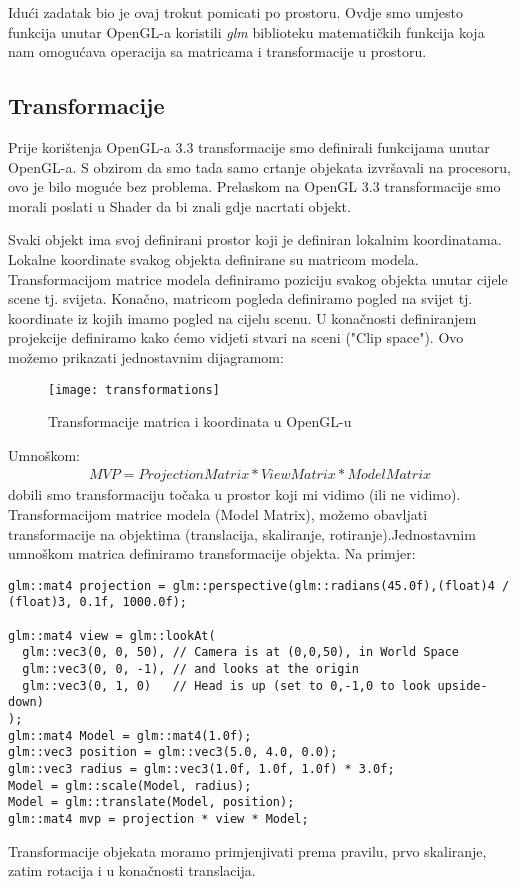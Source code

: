 Idući zadatak bio je ovaj trokut pomicati po prostoru. Ovdje smo umjesto funkcija unutar OpenGL-a koristili \emph{glm} biblioteku matematičkih funkcija koja nam omogućava operacija sa matricama i transformacije u prostoru.

\subsection{Transformacije}

Prije korištenja OpenGL-a 3.3 transformacije smo definirali funkcijama unutar OpenGL-a. S obzirom da smo tada samo crtanje objekata izvršavali na procesoru, ovo je bilo moguće bez problema. Prelaskom na OpenGL 3.3 transformacije smo morali poslati u Shader da bi znali gdje nacrtati objekt.

Svaki objekt ima svoj definirani prostor koji je definiran lokalnim koordinatama\cite{16}. Lokalne koordinate svakog objekta definirane su matricom modela. Transformacijom matrice modela definiramo poziciju svakog objekta unutar cijele scene tj. svijeta. Konačno, matricom pogleda definiramo pogled na svijet tj. koordinate iz kojih imamo pogled na cijelu scenu. U konačnosti definiranjem projekcije definiramo kako ćemo vidjeti stvari na sceni ("Clip space"). Ovo možemo prikazati jednostavnim dijagramom:\newpage
\begin{figure}[!http]
	\begin{center}
		\texttt{[image: transformations]}
		\caption{Transformacije matrica i koordinata u OpenGL-u\cite{15}}
		\label{fig:30}
	\end{center}
\end{figure}
Umnoškom:
\begin{equation}
	\begin{aligned}
		MVP = Projection Matrix * View Matrix * Model Matrix
	\end{aligned}
\end{equation}
dobili smo transformaciju točaka u prostor koji mi vidimo (ili ne vidimo)\cite{16}. Transformacijom matrice modela (Model Matrix), možemo obavljati transformacije na objektima (translacija, skaliranje, rotiranje).Jednostavnim umnoškom matrica definiramo transformacije objekta. Na primjer:
\begin{lstlisting}[style = myC++, label = {code:17}, caption = {Primjer transformacije objekata}]
glm::mat4 projection = glm::perspective(glm::radians(45.0f),(float)4 / (float)3, 0.1f, 1000.0f);
  
glm::mat4 view = glm::lookAt(
  glm::vec3(0, 0, 50), // Camera is at (0,0,50), in World Space
  glm::vec3(0, 0, -1), // and looks at the origin
  glm::vec3(0, 1, 0)   // Head is up (set to 0,-1,0 to look upside-down)
);
glm::mat4 Model = glm::mat4(1.0f);
glm::vec3 position = glm::vec3(5.0, 4.0, 0.0);
glm::vec3 radius = glm::vec3(1.0f, 1.0f, 1.0f) * 3.0f;
Model = glm::scale(Model, radius);
Model = glm::translate(Model, position);
glm::mat4 mvp = projection * view * Model;
\end{lstlisting}
Transformacije objekata moramo primjenjivati prema pravilu, prvo skaliranje, zatim rotacija i u konačnosti translacija\cite{15}. 

